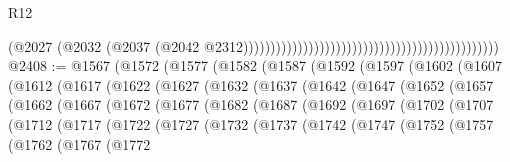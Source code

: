 \begin{lexlean}{R12}
\begin{coremodule}
                                                                                          (@2027
                                                                                            (@2032
                                                                                              (@2037
                                                                                                (@2042
                                                                                                  @2312)))))))))))))))))))))))))))))))))))))))))))))))
@2408 := @1567
    (@1572
      (@1577
        (@1582
          (@1587
            (@1592
              (@1597
                (@1602
                  (@1607
                    (@1612
                      (@1617
                        (@1622
                          (@1627
                            (@1632
                              (@1637
                                (@1642
                                  (@1647
                                    (@1652
                                      (@1657
                                        (@1662
                                          (@1667
                                            (@1672
                                              (@1677
                                                (@1682
                                                  (@1687
                                                    (@1692
                                                      (@1697
                                                        (@1702
                                                          (@1707
                                                            (@1712
                                                              (@1717
                                                                (@1722
                                                                  (@1727
                                                                    (@1732
                                                                      (@1737
                                                                        (@1742
                                                                          (@1747
                                                                            (@1752
                                                                              (@1757
                                                                                (@1762
                                                                                  (@1767
                                                                                    (@1772

\end{coremodule}
\end{lexlean}
